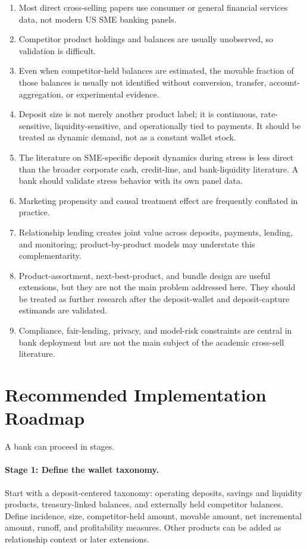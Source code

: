\documentclass[11pt]{article}
\begin{document}
\begin{enumerate}[leftmargin=*]
  \item Most direct cross-selling papers use consumer or general financial
  services data, not modern US SME banking panels.
  \item Competitor product holdings and balances are usually unobserved, so
  validation is difficult.
  \item Even when competitor-held balances are estimated, the movable fraction
  of those balances is usually not identified without conversion, transfer,
  account-aggregation, or experimental evidence.
  \item Deposit size is not merely another product label; it is continuous,
  rate-sensitive, liquidity-sensitive, and operationally tied to payments.
  It should be treated as dynamic demand, not as a constant wallet stock.
  \item The literature on SME-specific deposit dynamics during stress is less
  direct than the broader corporate cash, credit-line, and bank-liquidity
  literature. A bank should validate stress behavior with its own panel data.
  \item Marketing propensity and causal treatment effect are frequently
  conflated in practice.
  \item Relationship lending creates joint value across deposits, payments,
  lending, and monitoring; product-by-product models may understate this
  complementarity.
  \item Product-assortment, next-best-product, and bundle design are useful
  extensions, but they are not the main problem addressed here. They should be
  treated as further research after the deposit-wallet and deposit-capture
  estimands are validated.
  \item Compliance, fair-lending, privacy, and model-risk constraints are
  central in bank deployment but are not the main subject of the academic
  cross-sell literature.
\end{enumerate}

\section{Recommended Implementation Roadmap}

A bank can proceed in stages.

\paragraph{Stage 1: Define the wallet taxonomy.}
Start with a deposit-centered taxonomy: operating deposits, savings and
liquidity products, treasury-linked balances, and externally held competitor
balances. Define incidence, size, competitor-held amount, movable amount, net
incremental amount, runoff, and profitability measures. Other products can be
added as relationship context or later extensions.
\end{document}
